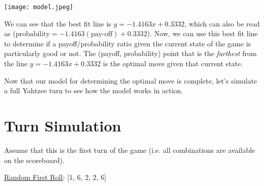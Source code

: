 \documentclass[12pt,a4paper]{article}
\begin{document}
\texttt{[image: model.jpeg]}

\clearpage

\begin{flushleft}
We can see that the best fit line is $y = -1.4163x + 0.3332$, which can also be read as ($\text{probability} = -1.4163(\text{pay-off}) + 0.3332$). Now, we can use this best fit line to determine if a payoff/probability ratio given the current state of the game is particularly good or not. The (payoff, probability) point that is the \textit{farthest} from the line $y = -1.4163x + 0.3332$ is the optimal move given that current state.

Now that our model for determining the optimal move is complete, let's simulate a full Yahtzee turn to see how the model works in action.
\end{flushleft}

\section{Turn Simulation}

\begin{flushleft}
Assume that this is the first turn of the game (i.e. all combinations are available on the scoreboard).

\vspace{5mm}

\underline{Random First Roll}: [1, 6, 2, 2, 6]
\end{flushleft}
\end{document}
